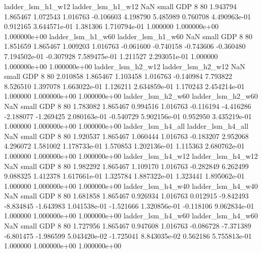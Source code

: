        ladder_lsm_h1_w12        ladder_lsm_h1_w12                   NaN      small      GDP                 8 80 1.943794       1.865467 1.072543       1.016763   -0.106603      4.198790      5.485989     0.760708   4.490963e-01  0.912165 3.644571e-01     1.381306   1.710794e-01            1.000000    1.000000e+00        1.000000e+00
       ladder_lsm_h1_w60        ladder_lsm_h1_w60                   NaN      small      GDP                 8 80 1.851659       1.865467 1.009203       1.016763   -0.061600     -0.740158     -0.743606    -0.360480   7.194502e-01 -0.307928 7.589475e-01     1.211527   2.293051e-01            1.000000    1.000000e+00        1.000000e+00
       ladder_lsm_h2_w12        ladder_lsm_h2_w12                   NaN      small      GDP                 8 80 2.010858       1.865467 1.103458       1.016763   -0.140984      7.793822      8.526510     1.397078   1.663022e-01  1.126211 2.634859e-01     1.170243   2.454214e-01            1.000000    1.000000e+00        1.000000e+00
       ladder_lsm_h2_w60        ladder_lsm_h2_w60                   NaN      small      GDP                 8 80 1.783082       1.865467 0.994516       1.016763   -0.116194     -4.416286     -2.188077    -1.269425   2.080163e-01 -0.540729 5.902156e-01     0.952950   3.435219e-01            1.000000    1.000000e+00        1.000000e+00
       ladder_lsm_h4_all        ladder_lsm_h4_all                   NaN      small      GDP                 8 80 1.920537       1.865467 1.060444       1.016763   -0.183207      2.952068      4.296072     1.581002   1.178733e-01  1.570853 1.202136e-01     1.115363   2.680762e-01            1.000000    1.000000e+00        1.000000e+00
       ladder_lsm_h4_w12        ladder_lsm_h4_w12                   NaN      small      GDP                 8 80 1.982292       1.865467 1.109170       1.016763   -0.282849      6.262499      9.088325     1.412378   1.617661e-01  1.325784 1.887322e-01     1.323441   1.895062e-01            1.000000    1.000000e+00        1.000000e+00
       ladder_lsm_h4_w40        ladder_lsm_h4_w40                   NaN      small      GDP                 8 80 1.681858       1.865467 0.926934       1.016763    0.012915     -9.842493     -8.834845    -1.643983   1.041538e-01 -1.521666 1.320856e-01    -0.118106   9.062834e-01            1.000000    1.000000e+00        1.000000e+00
       ladder_lsm_h4_w60        ladder_lsm_h4_w60                   NaN      small      GDP                 8 80 1.727956       1.865467 0.947608       1.016763   -0.086728     -7.371389     -6.801475    -1.986599   5.043420e-02 -1.725041 8.843035e-02     0.562186   5.755813e-01            1.000000    1.000000e+00        1.000000e+00
